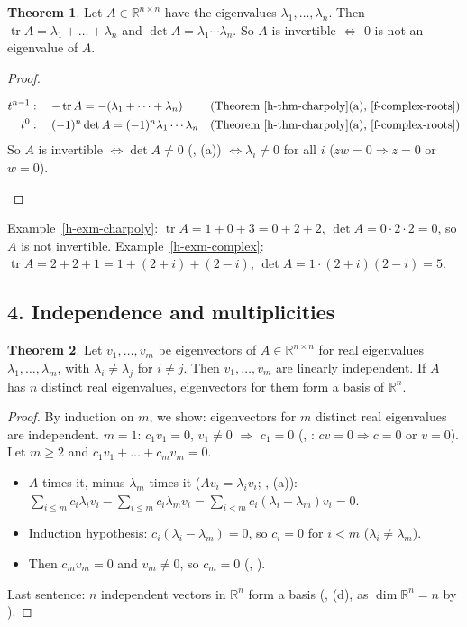 \documentclass[12pt]{article}
\newcommand{\R}{\mathbb R}
\DeclareMathOperator{\tr}{tr}
\theoremstyle{definition}
\newtheorem{theorem}{Theorem}
\newcommand{\boardtop}{\vspace*{-\abovedisplayskip}}
\begin{document}
\begin{theorem}\label{h-thm-trace-det}
Let \(A\in\R^{n\times n}\) have the eigenvalues \(\lambda_1,\dots,\lambda_n\). Then \(\tr A=\lambda_1+\dots+\lambda_n\)
and \(\det A=\lambda_1\cdots\lambda_n\). So \(A\) is invertible \(\iff\) \(0\) is not an eigenvalue of \(A\).
\end{theorem}
\begin{proof}
\begin{board}[Coefficients of \(p_A=(t-\lambda_1)\cdots(t-\lambda_n)\) (Definition~\ref{h-def-eigenvalues}):]
\boardtop
\begin{align*}
t^{n-1}&:\quad-\tr A=-(\lambda_1+\dots+\lambda_n)
&&\text{(Theorem~\ref{h-thm-charpoly}(a), \ref{f-complex-roots})}\\
t^0&:\quad(-1)^n\det A=(-1)^n\lambda_1\cdots\lambda_n
&&\text{(Theorem~\ref{h-thm-charpoly}(a), \ref{f-complex-roots})}
\end{align*}
So \(A\) is invertible \(\iff\det A\ne0\) (, (a)) \(\iff\lambda_i\ne0\) for all \(i\)
(\(zw=0\Rightarrow z=0\) or \(w=0\)).
\end{board}
\nopagebreak
\end{proof}
Example~\ref{h-exm-charpoly}: \(\tr A=1+0+3=0+2+2\), \(\det A=0\cdot2\cdot2=0\), so \(A\) is not invertible.
Example~\ref{h-exm-complex}: \(\tr A=2+2+1=1+(2+i)+(2-i)\), \(\det A=1\cdot(2+i)(2-i)=5\).

\subsection*{4. Independence and multiplicities}

\begin{theorem}\label{h-thm-indep}
Let \(v_1,\dots,v_m\) be eigenvectors of \(A\in\R^{n\times n}\) for real eigenvalues \(\lambda_1,\dots,\lambda_m\), with
\(\lambda_i\ne\lambda_j\) for \(i\ne j\). Then \(v_1,\dots,v_m\) are linearly independent. If \(A\) has \(n\) distinct real
eigenvalues, eigenvectors for them form a basis of \(\R^n\).
\end{theorem}
\begin{proof}
By induction on \(m\), we show: eigenvectors for \(m\) distinct real eigenvalues are independent. \(m=1\):
\(c_1v_1=0\), \(v_1\ne0\) \(\Rightarrow\) \(c_1=0\) (, :
\(cv=0\Rightarrow c=0\) or \(v=0\)). Let \(m\geqslant2\) and
\(c_1v_1+\dots+c_mv_m=0\).
\begin{itemize}
\item \(A\) times it, minus \(\lambda_m\) times it (\(Av_i=\lambda_iv_i\); , (a)):
\(\sum_{i\leqslant m}c_i\lambda_iv_i-\sum_{i\leqslant m}c_i\lambda_mv_i=\sum_{i<m}c_i(\lambda_i-\lambda_m)v_i=0\).
\item Induction hypothesis: \(c_i(\lambda_i-\lambda_m)=0\), so \(c_i=0\) for \(i<m\) (\(\lambda_i\ne\lambda_m\)).
\item Then \(c_mv_m=0\) and \(v_m\ne0\), so \(c_m=0\) (, ).
\end{itemize}
Last sentence: \(n\) independent vectors in \(\R^n\) form a basis (, (d), as \(\dim\R^n=n\) by
).
\end{proof}
\end{document}
